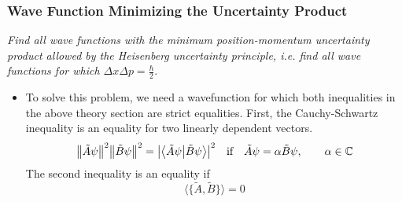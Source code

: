 \documentclass[11pt, a4paper]{article}
\begin{document}
\subsubsection{Wave Function Minimizing the Uncertainty Product}
\textit{Find all wave functions with the minimum position-momentum uncertainty product allowed by the Heisenberg uncertainty principle, i.e. find all wave functions for which $ \Delta x \Delta p = \frac{\hbar}{2} $}.
\begin{itemize}
	\item To solve this problem, we need a wavefunction for which both inequalities in the above theory section are strict equalities. First, the Cauchy-Schwartz inequality is an equality for two linearly dependent vectors.
	\begin{equation*}
		\norm{\tilde{A}\psi}^{2}\norm{\tilde{B}\psi}^{2} = \abs{\braket{\tilde{A}\psi}{\tilde{B}\psi}}^{2} \quad \text{if} \quad \tilde{A}\psi = \alpha \tilde{B}\psi, \qquad \alpha \in \mathbb{C}
	\end{equation*}
	The second inequality is an equality if 
	\begin{equation*}
		\big\langle \big\{\tilde{A}, \tilde{B}\big\} \big\rangle = 0
	\end{equation*}
	

\end{itemize}
\end{document}
